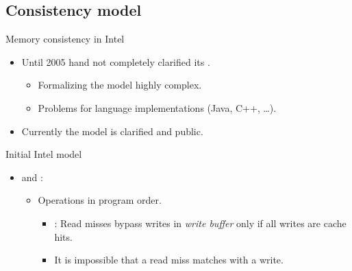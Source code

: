 \subsection{Consistency model}

\begin{frame}[t]{Memory consistency in Intel}
\begin{itemize}
  \item Until 2005 hand not completely clarified its
        .
    \begin{itemize}
      \item Formalizing the model highly complex.
      \item Problems for language implementations (Java, C++, \ldots).
    \end{itemize}

  \item Currently the model is clarified and public.
\end{itemize}
\end{frame}

\begin{frame}[t]{Initial Intel model}
\begin{itemize}
  \item {} and :
    \begin{itemize}
      \item Operations in program order.
        \begin{itemize}
          \item {}: 
                Read misses bypass writes in \emph{write buffer} 
                only if all writes are cache hits.
          \item It is impossible that a read miss matches with a write.
        \end{itemize}
    \end{itemize}
\end{itemize}
\end{frame}

